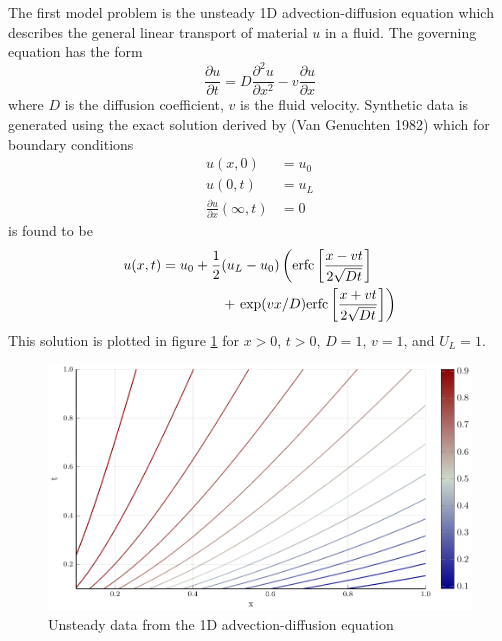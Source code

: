 \documentclass{article}
\begin{document}
The first model problem is the unsteady 1D advection-diffusion equation which describes the general linear transport of material $u$ in a fluid. The governing equation has the form 
\begin{equation} 
\frac{\partial u}{\partial t} = D\frac{\partial^2 u}{\partial x^2} - v \frac{\partial u}{\partial x}
\end{equation}
where $D$ is the diffusion coefficient, $v$ is the fluid velocity. Synthetic data is generated using the exact solution derived by (Van Genuchten 1982) which for boundary conditions 
\begin{align}
  u(x,0) &= u_0 \\
  u(0,t) &= u_L \\
  \frac{\partial u}{\partial x}(\infty, t) &= 0
\end{align}
is found to be 
\begin{equation}
  \begin{split}
  u(x,t) = u_0 + \frac{1}{2}&(u_L - u_0) \left({\rm erfc}\left[ \frac{x - vt}{2\sqrt{Dt}}\right]\right. \\
  &+ \left.{\rm exp}(vx/D) {\rm erfc}\left[ \frac{x + vt}{2\sqrt{Dt}}\right] \right)
  \end{split}
\end{equation}
This solution is plotted in figure \ref{fig:advdif} for $x>0$, $t>0$, $D=1$, $v=1$, and $U_L = 1$.

\begin{figure}
\vskip 0.2in
\begin{center}
\centerline{\includegraphics[width=\columnwidth]{./figures/advdif}}
\caption{Unsteady data from the 1D advection-diffusion equation}
\label{fig:advdif}
\end{center}
\vskip -0.2in
\end{figure}
\end{document}

